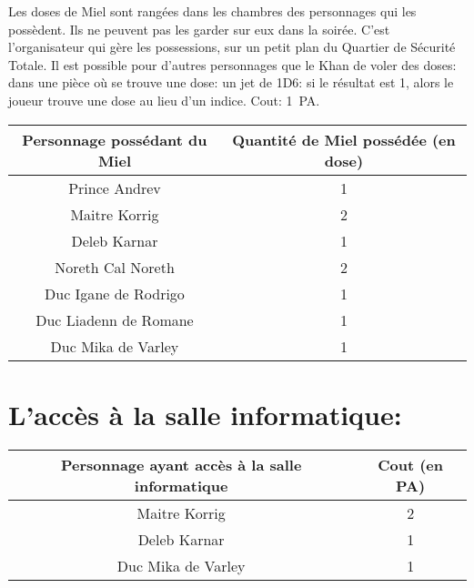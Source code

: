 \documentclass{article}
\begin{document}
Les doses de Miel sont rangées dans les chambres des personnages qui les
possèdent. Ils ne peuvent pas les garder sur eux dans la soirée. C'est
l'organisateur qui gère les possessions, sur un petit plan du Quartier de
Sécurité Totale. Il est possible pour d'autres personnages que le Khan de
voler des doses: dans une pièce où se trouve une dose: un jet de 1D6: si
le résultat est 1, alors le joueur trouve une dose au lieu d'un indice. Cout:
1~PA.

\begin{center}
    \begin{tabular}{|c|c|}
        \hline
        Personnage possédant du Miel & Quantité de Miel possédée (en dose)\\
        \hline
        Prince Andrev & 1 \\
        Maitre Korrig & 2 \\
        Deleb Karnar & 1 \\
        Noreth Cal Noreth & 2 \\
        Duc Igane de Rodrigo & 1 \\
        Duc Liadenn de Romane & 1 \\
        Duc Mika de Varley & 1 \\
        \hline
    \end{tabular}
\end{center}

\section*{L'accès à la salle informatique:}
\begin{center}
    \begin{tabular}{|c|c|}
        \hline
        Personnage ayant accès à la salle informatique & Cout (en PA)\\
        \hline
        Maitre Korrig & 2 \\
        Deleb Karnar & 1 \\
        Duc Mika de Varley & 1 \\
        \hline
    \end{tabular}
\end{center}
\end{document}
